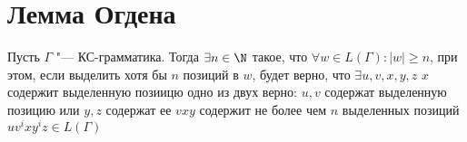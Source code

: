 
\section{Лемма Огдена}
\begin{theorem}

Пусть $\Gamma$ "--- КС-грамматика. Тогда $\exists n \in \N$ такое, что $\forall w \in L(\Gamma) \colon |w| \geq n$, 
при этом, если выделить хотя бы $n$ позиций в $w$, будет верно, что $\exists u, v, x, y, z$
$x$ содержит выделенную позиицю
одно из двух верно: $u, v$ содержат выделенную позицию или $y, z$ содержат ее
$vxy$ содержит не более чем $n$ выделенных позиций
$uv^ixy^iz \in L(\Gamma)$ %
\end{theorem}
